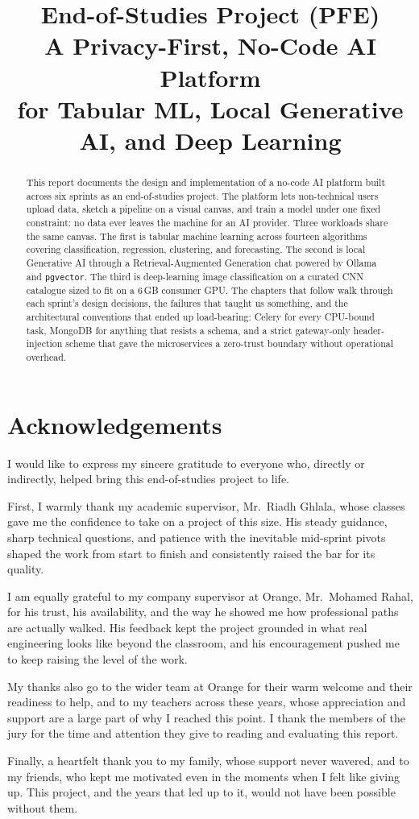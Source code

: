 \documentclass[12pt, a4paper, oneside]{report}
\title{End-of-Studies Project (PFE)\\[6pt] \Large A Privacy-First, No-Code AI Platform\\ \large for Tabular ML, Local Generative AI, and Deep Learning}
\author{}
\date{}
\begin{document}


\chapter*{Acknowledgements}

I would like to express my sincere gratitude to everyone who, directly
or indirectly, helped bring this end-of-studies project to life.

First, I warmly thank my academic supervisor, Mr.~Riadh Ghlala, whose
classes gave me the confidence to take on a project of this size. His
steady guidance, sharp technical questions, and patience with the
inevitable mid-sprint pivots shaped the work from start to finish and
consistently raised the bar for its quality.

I am equally grateful to my company supervisor at Orange, Mr.~Mohamed
Rahal, for his trust, his availability, and the way he showed me how
professional paths are actually walked. His feedback kept the project
grounded in what real engineering looks like beyond the classroom, and
his encouragement pushed me to keep raising the level of the work.

My thanks also go to the wider team at Orange for their warm welcome
and their readiness to help, and to my teachers across these years,
whose appreciation and support are a large part of why I reached this
point. I thank the members of the jury for the time and attention they
give to reading and evaluating this report.

Finally, a heartfelt thank you to my family, whose support never
wavered, and to my friends, who kept me motivated even in the moments
when I felt like giving up. This project, and the years that led up to
it, would not have been possible without them.

\newpage

\begin{abstract}
This report documents the design and implementation of a no-code AI
platform built across six sprints as an end-of-studies project. The
platform lets non-technical users upload data, sketch a pipeline on a
visual canvas, and train a model under one fixed constraint: no data
ever leaves the machine for an AI provider. Three workloads share the
same canvas. The
first is tabular machine learning across fourteen algorithms covering
classification, regression, clustering, and forecasting. The second is
local Generative AI through a Retrieval-Augmented Generation chat
powered by Ollama and \texttt{pgvector}. The third is deep-learning
image classification on a curated CNN catalogue sized to fit on a 6\,GB
consumer GPU. The chapters that follow walk through each sprint's
design decisions, the failures that taught us something, and the
architectural conventions that ended up load-bearing: Celery for every
CPU-bound task, MongoDB for anything that resists a schema, and a
strict gateway-only header-injection scheme that gave the
microservices a zero-trust boundary without operational overhead.
\end{abstract}
\end{document}

